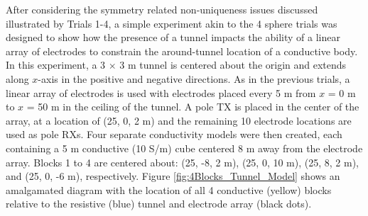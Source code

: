 \documentclass[preprint,authoryear,12pt]{elsarticle}
\begin{document}
After considering the symmetry related non-uniqueness issues discussed illustrated by Trials 1-4, a simple experiment akin to the 4 sphere trials was designed to show how the presence of a tunnel impacts the ability of a linear array of electrodes to constrain the around-tunnel location of a conductive body. In this experiment, a 3 $\times$ 3 m tunnel is centered about the origin and extends along $x$-axis in the positive and negative directions. As in the previous trials, a linear array of electrodes is used with electrodes placed every 5 m from $x$ = 0 m to $x$ = 50 m in the ceiling of the tunnel. A pole TX is placed in the center of the array, at a location of (25, 0, 2 m) and the remaining 10 electrode locations are used as pole RXs. Four separate conductivity models were then created, each containing a 5 m conductive (10 S/m) cube centered 8 m away from the electrode array. Blocks 1 to 4 are centered about: (25, -8, 2 m), (25, 0, 10 m), (25, 8, 2 m), and (25, 0, -6 m), respectively. Figure \ref{fig:4Blocks_Tunnel_Model} shows an amalgamated diagram with the location of all 4 conductive (yellow) blocks relative to the resistive (blue) tunnel and electrode array (black dots).
\end{document}
